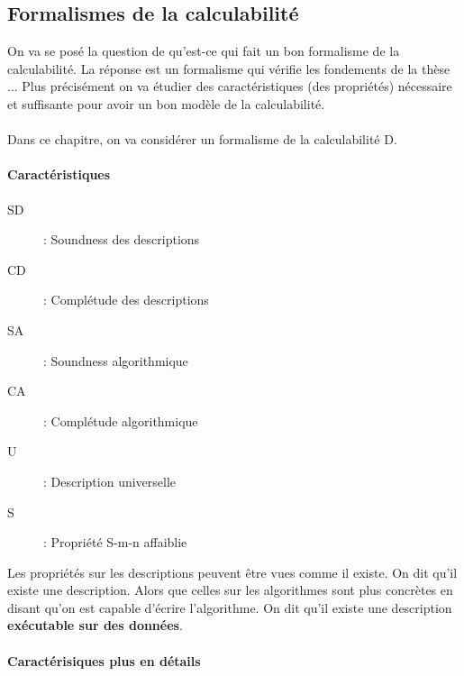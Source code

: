 \subsection{Formalismes de la calculabilité}
\label{sub:formalismes_de_la_calculabilit_}
On va se posé la question de qu'est-ce qui fait un bon formalisme de la 
calculabilité. La réponse est un formalisme qui vérifie les fondements de la 
thèse ... Plus précisément on va étudier des caractéristiques (des propriétés) 
nécessaire et suffisante pour avoir un bon modèle de la calculabilité.

\paragraph{} Dans ce chapitre, on va considérer un formalisme de la 
calculabilité D.

\paragraph{Caractéristiques} 
\begin{description}
	\item[SD] : Soundness des descriptions
	\item[CD] : Complétude des descriptions
	\item[SA] : Soundness algorithmique
	\item[CA] : Complétude algorithmique
	\item[U] : Description universelle
	\item[S] : Propriété S-m-n affaiblie
\end{description}

\begin{myrem}
	Les propriétés sur les descriptions peuvent être vues comme il existe. On 
	dit qu'il existe une description.
	Alors que celles sur les algorithmes sont plus concrètes en disant qu'on 
	est capable d'écrire l'algorithme. On dit qu'il existe une description 
	\textbf{exécutable sur des données}.
\end{myrem}

\paragraph{Caractérisiques plus en détails}
